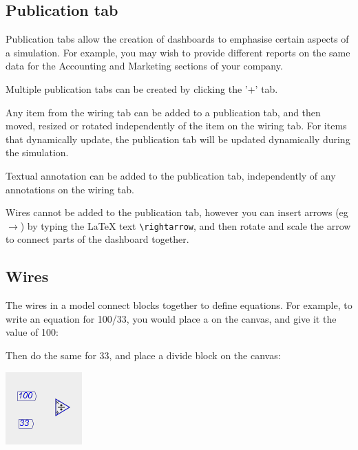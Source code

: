 \subsection{Publication tab}

\label{tabs:Publication}

Publication tabs allow the creation of dashboards to emphasise certain
aspects of a simulation. For example, you may wish to provide different
reports on the same data for the Accounting and Marketing sections
of your company.

Multiple publication tabs can be created by clicking the '+' tab.

Any item from the wiring tab can be added to a publication tab, and
then moved, resized or rotated independently of the item on the wiring
tab. For items that dynamically update, the publication tab will be
updated dynamically during the simulation.

Textual annotation can be added to the publication tab, independently
of any annotations on the wiring tab.

Wires cannot be added to the publication tab, however you can insert
arrows (eg $\rightarrow$) by typing the LaTeX text \verb+\rightarrow+,
and then rotate and scale the arrow to connect parts of the dashboard
together.

\subsection{Wires}

\label{Wires}

The wires in a model connect blocks together to define equations.
For example, to write an equation for 100/33, you would place a 
on the canvas, and give it the value of 100:
\begin{center}
\par\end{center}

Then do the same for 33, and place a divide block on the canvas:
\begin{center}
\includegraphics{images/NewItem123} 
\par\end{center}

